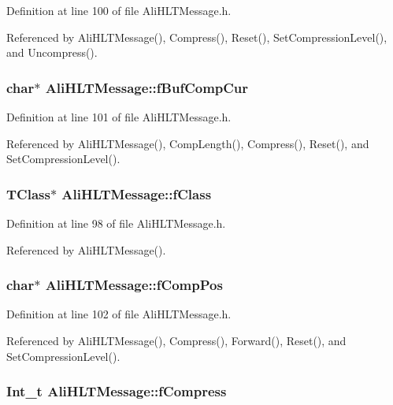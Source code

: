 Definition at line 100 of file Ali\-HLTMessage.h.

Referenced by Ali\-HLTMessage(), Compress(), Reset(), Set\-Compression\-Level(), and Uncompress().
\subsubsection{\setlength{\rightskip}{0pt plus 5cm}char$\ast$ {\bf Ali\-HLTMessage::f\-Buf\-Comp\-Cur}\hspace{0.3cm}{\tt  [private]}}\label{classAliHLTMessage_r4}




Definition at line 101 of file Ali\-HLTMessage.h.

Referenced by Ali\-HLTMessage(), Comp\-Length(), Compress(), Reset(), and Set\-Compression\-Level().
\subsubsection{\setlength{\rightskip}{0pt plus 5cm}TClass$\ast$ {\bf Ali\-HLTMessage::f\-Class}\hspace{0.3cm}{\tt  [private]}}\label{classAliHLTMessage_r1}




Definition at line 98 of file Ali\-HLTMessage.h.

Referenced by Ali\-HLTMessage().
\subsubsection{\setlength{\rightskip}{0pt plus 5cm}char$\ast$ {\bf Ali\-HLTMessage::f\-Comp\-Pos}\hspace{0.3cm}{\tt  [private]}}\label{classAliHLTMessage_r5}




Definition at line 102 of file Ali\-HLTMessage.h.

Referenced by Ali\-HLTMessage(), Compress(), Forward(), Reset(), and Set\-Compression\-Level().
\subsubsection{\setlength{\rightskip}{0pt plus 5cm}Int\_\-t {\bf Ali\-HLTMessage::f\-Compress}\hspace{0.3cm}{\tt  [private]}}\label{classAliHLTMessage_r2}




